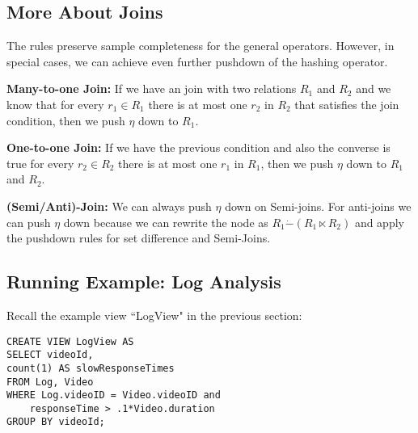 \subsection{More About Joins}
The rules preserve sample completeness for the general operators. 
However, in special cases, we can achieve even further pushdown of the hashing operator. 

\textbf{Many-to-one Join: } If we have an join with two relations $R_1$ and $R_2$ and we know that for every $r_1 \in R_1$ there is at most one $r_2$ in $R_2$ that satisfies the join condition, then we push $\eta$ down to $R_1$.

\textbf{One-to-one Join: } If we have the previous condition and also the converse is true for every $r_2 \in R_2$ there is at most one $r_1$ in $R_1$, then we push $\eta$ down to $R_1$ and $R_2$.

\textbf{(Semi/Anti)-Join: } We can always push $\eta$ down on Semi-joins. For anti-joins we can push $\eta$ down because we can rewrite the node as $R_1 \dot{-} (R_1 \ltimes R_2) $ and apply the pushdown rules for set difference and Semi-Joins.


\subsection{Running Example: Log Analysis}
Recall the example view ``LogView" in the previous section:
\begin{lstlisting} 
CREATE VIEW LogView AS 
SELECT videoId, 
count(1) AS slowResponseTimes 
FROM Log, Video
WHERE Log.videoID = Video.videoID and
    responseTime > .1*Video.duration
GROUP BY videoId;
\end{lstlisting}

